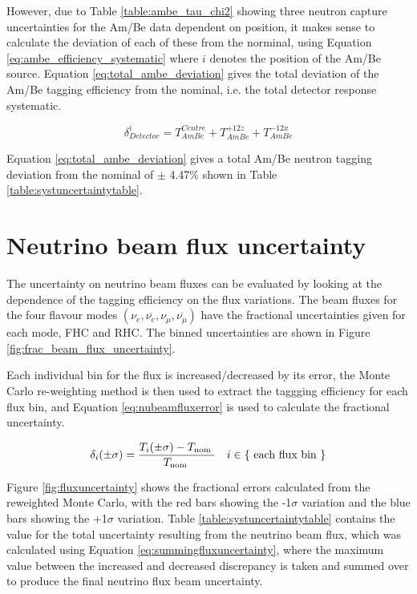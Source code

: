 However, due to Table \ref{table:ambe_tau_chi2} showing three neutron capture uncertainties for the Am/Be data dependent on position, it makes sense to calculate the deviation of each of these from the norminal, using Equation \ref{eq:ambe_efficiency_systematic} where $i$ denotes the position of the Am/Be source. Equation \ref{eq:total_ambe_deviation} gives the total deviation of the Am/Be tagging efficiency from the nominal, i.e. the total detector response systematic.

\begin{equation}
    \delta_{Detector}^{i}= T_{AmBe}^{Centre} + T_{AmBe}^{+12z} + T_{AmBe}^{-12x} 
\label{eq:total_ambe_deviation}
\end{equation}

Equation \ref{eq:total_ambe_deviation} gives a total Am/Be neutron tagging deviation from the nominal of $\pm$ 4.47\% shown in Table \ref{table:systuncertaintytable}. 


\section{Neutrino beam flux uncertainty}

The uncertainty on neutrino beam fluxes can be evaluated by looking at the dependence of the tagging efficiency on the flux variations. The beam fluxes for the four flavour modes 
$\left(\nu_{e}, \overline{\nu_{e}}, \nu_{\mu}, \overline{\nu_{\mu}}\right)$ have the fractional uncertainties given for each mode, FHC and RHC. The binned uncertainties are shown in Figure \ref{fig:frac_beam_flux_uncertainty}.


Each individual bin for the flux is increased/decreased by its error, the Monte Carlo re-weighting method is then used to extract the taggging efficiency for each flux bin, and Equation \ref{eq:nubeamfluxerror} is used to calculate the fractional uncertainty.

\begin{equation}
\centering 
\delta_{i}(\pm \sigma)=\frac{T_{i}(\pm \sigma)-T_{\text {nom }}}{T_{\text {nom }}} \quad i \in\{\text { each flux bin }\}
\label{eq:nubeamfluxerror}
\end{equation}


Figure \ref{fig:fluxuncertainty} shows the fractional errors calculated from the reweighted Monte Carlo, with the red bars showing the -1$\sigma$ variation and the blue bars showing the +1$\sigma$ variation. Table \ref{table:systuncertaintytable} contains the value for the total uncertainty resulting from the neutrino beam flux, which was calculated using Equation \ref{eq:summingfluxuncertainty}, where the maximum value between the increased and decreased discrepancy is taken and summed over to produce the final neutrino flux beam uncertainty.
\newline

